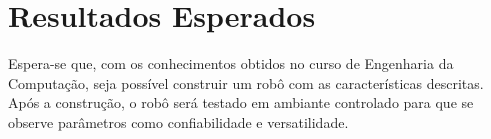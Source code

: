 \documentclass[12pt,a4paper]{article}
\begin{document}
\section{Resultados Esperados}
	Espera-se que, com os conhecimentos obtidos no curso de Engenharia da Computação, seja possível construir um robô com as características descritas. Após a construção, o robô será testado em ambiante controlado para que se observe parâmetros como confiabilidade e versatilidade.



\nocite{*}


\end{document}
